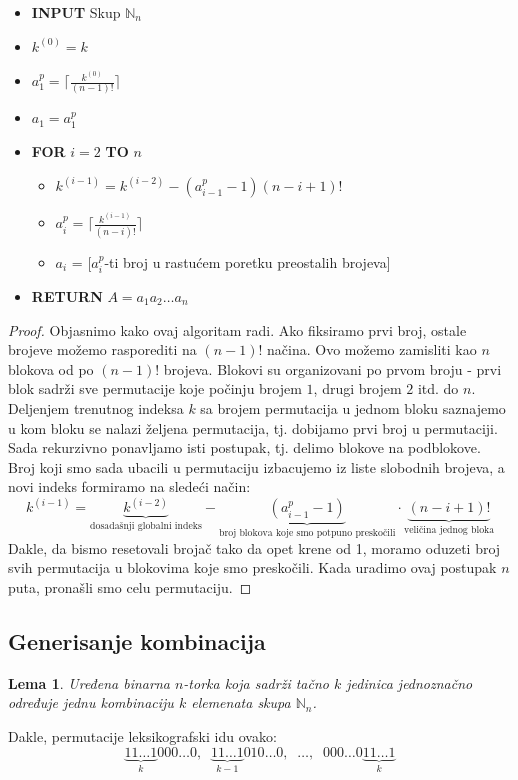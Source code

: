 \documentclass[a4paper,12pt]{article}
\numberwithin{algorithm}{section}
\theoremstyle{plain}
\newtheorem{lemma}[theorem]{Lema}
\theoremstyle{definition}
\theoremstyle{remark}
\begin{document}
\begin{algorithm}[!h]
    \caption{$k$-ta permutacija}
    \begin{itemize}
        \item \textbf{INPUT} Skup $\mathbb{N}_n$
        \item $k^{(0)} = k$
        \item $a^p_1 = \bigg\lceil \frac{k^{(0)}}{(n-1)!}\bigg\rceil$
        \item $a_1 = a_1^p$
        \item \textbf{FOR} $i = 2$ \textbf{TO} $n$
        \begin{itemize}[label=$\circ$]
            \item $k^{(i-1)} = k^{(i-2)}-(a^p_{i-1}-1)(n-i+1)!$
            \item $a_i^p = \bigg\lceil \frac{k^{(i-1)}}{(n-i)!}\bigg\rceil$
            \item $a_i$ = [$a_i^p$-ti broj u rastućem poretku preostalih brojeva]
        \end{itemize}
        \item \textbf{RETURN} $A = a_1a_2\ldots a_n$
    \end{itemize}
\end{algorithm}
\begin{proof}
    Objasnimo kako ovaj algoritam radi. Ako fiksiramo prvi broj, ostale brojeve
    možemo rasporediti na $(n-1)!$ načina. Ovo možemo zamisliti kao $n$ blokova 
    od po $(n-1)!$ brojeva. Blokovi su organizovani po prvom broju - prvi blok
    sadrži sve permutacije koje počinju brojem $1$, drugi brojem $2$ itd. do $n$.
    Deljenjem trenutnog indeksa $k$ sa brojem permutacija u jednom bloku saznajemo
    u kom bloku se nalazi željena permutacija, tj. dobijamo prvi broj u permutaciji. Sada rekurzivno ponavljamo isti postupak,
    tj. delimo blokove na podblokove. Broj koji smo sada ubacili u permutaciju izbacujemo
    iz liste slobodnih brojeva, a novi indeks formiramo na sledeći način:
    $$k^{(i-1)} = \underbrace{k^{(i-2)}}_{\text{dosadašnji globalni indeks}} - \underbrace{(a_{i-1}^p - 1)}_{\text{broj blokova koje smo potpuno preskočili}} \cdot \underbrace{(n - i + 1)!}_{\text{veličina jednog bloka}}$$
    Dakle, da bismo resetovali brojač tako da opet krene od 1, moramo oduzeti broj 
    svih permutacija u blokovima koje smo preskočili. Kada uradimo ovaj postupak $n$ puta, pronašli smo celu permutaciju.
\end{proof}
\subsection{Generisanje kombinacija}
\begin{lemma}
    Uređena binarna $n$-torka koja sadrži tačno $k$ jedinica jednoznačno određuje
    jednu kombinaciju $k$ elemenata skupa $\mathbb{N}_n$.
\end{lemma}
Dakle, permutacije leksikografski idu ovako:
\[ \underbrace{11\ldots1}_{k}000\ldots0, \;\; \underbrace{11\ldots1}_{k-1}010\ldots0, \;\; \ldots,  \;\; 000\ldots0\underbrace{11\ldots1}_{k} \]
\end{document}
